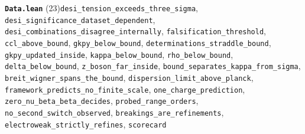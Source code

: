 \documentclass[11pt,a4paper]{article}
\theoremstyle{sudef}
\begin{document}
\noindent\textbf{\texttt{Data.lean}} (23)\quad \texttt{desi\_\allowbreak tension\_\allowbreak exceeds\_\allowbreak three\_\allowbreak sigma}, \texttt{desi\_\allowbreak significance\_\allowbreak dataset\_\allowbreak dependent}, \texttt{desi\_\allowbreak combinations\_\allowbreak disagree\_\allowbreak internally}, \texttt{falsification\_\allowbreak threshold}, \texttt{ccl\_\allowbreak above\_\allowbreak bound}, \texttt{gkpy\_\allowbreak below\_\allowbreak bound}, \texttt{determinations\_\allowbreak straddle\_\allowbreak bound}, \texttt{gkpy\_\allowbreak updated\_\allowbreak inside}, \texttt{kappa\_\allowbreak below\_\allowbreak bound}, \texttt{rho\_\allowbreak below\_\allowbreak bound}, \texttt{delta\_\allowbreak below\_\allowbreak bound}, \texttt{z\_\allowbreak boson\_\allowbreak far\_\allowbreak inside}, \texttt{bound\_\allowbreak separates\_\allowbreak kappa\_\allowbreak from\_\allowbreak sigma}, \texttt{breit\_\allowbreak wigner\_\allowbreak spans\_\allowbreak the\_\allowbreak bound}, \texttt{dispersion\_\allowbreak limit\_\allowbreak above\_\allowbreak planck}, \texttt{framework\_\allowbreak predicts\_\allowbreak no\_\allowbreak finite\_\allowbreak scale}, \texttt{one\_\allowbreak charge\_\allowbreak prediction}, \texttt{zero\_\allowbreak nu\_\allowbreak beta\_\allowbreak beta\_\allowbreak decides}, \texttt{probed\_\allowbreak range\_\allowbreak orders}, \texttt{no\_\allowbreak second\_\allowbreak switch\_\allowbreak observed}, \texttt{breakings\_\allowbreak are\_\allowbreak refinements}, \texttt{electroweak\_\allowbreak strictly\_\allowbreak refines}, \texttt{scorecard}\par\smallskip
\end{document}
